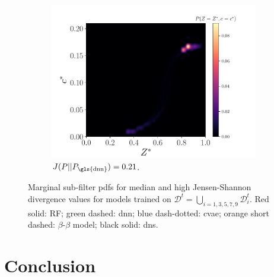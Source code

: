 \documentclass[review]{elsarticle}
\begin{document}
\begin{figure}[!tbp]
\begin{subfigure}[t]{0.32\textwidth}
    \includegraphics[page=4,width=\textwidth]{./figs/pdfs_182976.pdf}%
    \caption{$J(P||P_{\text{\gls{dnn}}})=0.21$.}\label{fig:pdfs_skip_3}%
  \end{subfigure}%
  \caption{Marginal sub-filter \glspl{pdf} for median and high Jensen-Shannon divergence values for models trained on $\mathcal{D}^t = \bigcup\limits_{i=1, 3, 5, 7, 9} \mathcal{D}_i^t$. Red solid: RF; green dashed: \gls{dnn}; blue dash-dotted: \gls{cvae}; orange short dashed: $\beta$-$\beta$ model; black solid: \gls{dns}.}\label{fig:pdfs_skip}%
\end{figure}%

\section{Conclusion}\label{sec:ccl}
\end{document}
